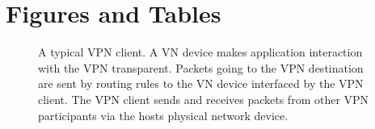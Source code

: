 \section{Figures and Tables}
\begin{figure}[ht]
\centering
{}
\caption[A typical VPN client]{A typical VPN client.  A VN device makes
application interaction with the VPN transparent.  Packets going to the VPN
destination are sent by routing rules to the VN device interfaced by the VPN
client.  The VPN client sends and receives packets from other VPN participants
via the hosts physical network device.}
\label{fig:vpn}
\end{figure}
